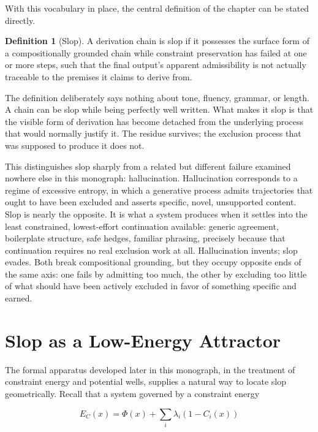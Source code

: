 \documentclass[11pt,oneside]{book}
\theoremstyle{plain}
\theoremstyle{definition}
\newtheorem{definition}[theorem]{Definition}
\theoremstyle{remark}
\begin{document}
With this vocabulary in place, the central definition of the chapter can be stated directly.

\begin{definition}[Slop]
A derivation chain is slop if it possesses the surface form of a compositionally grounded chain while constraint preservation has failed at one or more steps, such that the final output's apparent admissibility is not actually traceable to the premises it claims to derive from.
\end{definition}

The definition deliberately says nothing about tone, fluency, grammar, or length. A chain can be slop while being perfectly well written. What makes it slop is that the visible form of derivation has become detached from the underlying process that would normally justify it. The residue survives; the exclusion process that was supposed to produce it does not.

This distinguishes slop sharply from a related but different failure examined nowhere else in this monograph: hallucination. Hallucination corresponds to a regime of excessive entropy, in which a generative process admits trajectories that ought to have been excluded and asserts specific, novel, unsupported content. Slop is nearly the opposite. It is what a system produces when it settles into the least constrained, lowest-effort continuation available: generic agreement, boilerplate structure, safe hedges, familiar phrasing, precisely because that continuation requires no real exclusion work at all. Hallucination invents; slop evades. Both break compositional grounding, but they occupy opposite ends of the same axis: one fails by admitting too much, the other by excluding too little of what should have been actively excluded in favor of something specific and earned.

\section{Slop as a Low-Energy Attractor}

The formal apparatus developed later in this monograph, in the treatment of constraint energy and potential wells, supplies a natural way to locate slop geometrically. Recall that a system governed by a constraint energy

\begin{equation}
E_C(x)
=
\Phi(x)
+
\sum_i
\lambda_i(1-C_i(x))
\end{equation}
\end{document}
